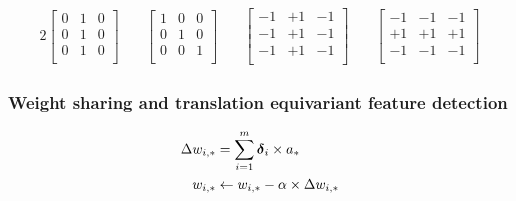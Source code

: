\documentclass[xcolor={table}]{beamer}
\begin{document}
 \begin{frame} 
\begin{alignat}{2}
\begin{bmatrix}
0 & 1 & 0\\
0 & 1 & 0\\
0 & 1 & 0\\
\end{bmatrix}
&\quad
\begin{bmatrix}
1 & 0 & 0\\
0 & 1 & 0\\
0 & 0 & 1\\
\end{bmatrix}
&\quad
\begin{bmatrix}
-1 & +1 & -1\\
-1 & +1 & -1\\
-1 & +1 & -1\\
\end{bmatrix}
&\quad
\begin{bmatrix}
-1 & -1 & -1\\
+1 & +1 & +1\\
-1 & -1 & -1\\
\end{bmatrix}
\label{eq:3filterexamples}
\end{alignat}
\end{frame} 

\subsubsection{Weight sharing and translation equivariant feature detection}

 \begin{frame} 
\begin{alignat}{2}
\Delta w_{i,*} &= \sum_{i=1}^m \boldsymbol{\delta}_i \times  a_* \notag \\
w_{i,*} &\leftarrow w_{i,*} - \alpha \times \Delta w_{i,*}
\label{eqn:filterweightupdaterule}
\end{alignat}
\end{frame} 
\end{document}
